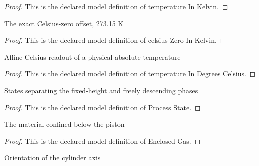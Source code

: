\begin{proof}
  This is the declared model definition of temperature In Kelvin.
\end{proof}
\begin{definition}
  \label{def:physics:phyx-mini-0447:phyxminiproblems-problemphyxmini0447-celsiuszeroinkelvin}
  The exact Celsius-zero offset, 273.15 K
\end{definition}
\begin{proof}
  This is the declared model definition of celsius Zero In Kelvin.
\end{proof}
\begin{definition}
  \label{def:physics:phyx-mini-0447:phyxminiproblems-problemphyxmini0447-temperatureindegreescelsius}
  Affine Celsius readout of a physical absolute temperature
\end{definition}
\begin{proof}
  This is the declared model definition of temperature In Degrees Celsius.
\end{proof}
\begin{definition}
  \label{def:physics:phyx-mini-0447:phyxminiproblems-problemphyxmini0447-processstate}
  States separating the fixed-height and freely descending phases
\end{definition}
\begin{proof}
  This is the declared model definition of Process State.
\end{proof}
\begin{definition}
  \label{def:physics:phyx-mini-0447:phyxminiproblems-problemphyxmini0447-enclosedgas}
  The material confined below the piston
\end{definition}
\begin{proof}
  This is the declared model definition of Enclosed Gas.
\end{proof}
\begin{definition}
  \label{def:physics:phyx-mini-0447:phyxminiproblems-problemphyxmini0447-cylinderorientation}
  Orientation of the cylinder axis
\end{definition}
